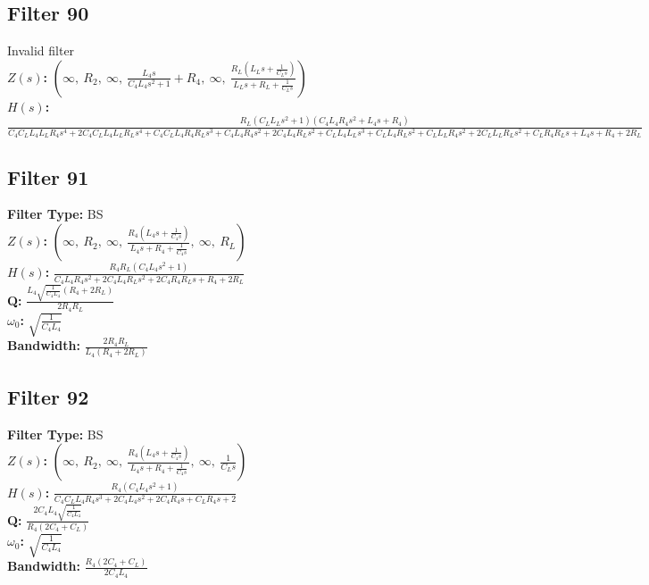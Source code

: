 \documentclass{article}
\begin{document}
\subsection*{Filter 90}
Invalid filter \\ 
\textbf{$Z(s)$:} $\left( \infty, \  R_{2}, \  \infty, \  \frac{L_{4} s}{C_{4} L_{4} s^{2} + 1} + R_{4}, \  \infty, \  \frac{R_{L} \left(L_{L} s + \frac{1}{C_{L} s}\right)}{L_{L} s + R_{L} + \frac{1}{C_{L} s}}\right)$ \\ 
\textbf{$H(s)$:} $\frac{R_{L} \left(C_{L} L_{L} s^{2} + 1\right) \left(C_{4} L_{4} R_{4} s^{2} + L_{4} s + R_{4}\right)}{C_{4} C_{L} L_{4} L_{L} R_{4} s^{4} + 2 C_{4} C_{L} L_{4} L_{L} R_{L} s^{4} + C_{4} C_{L} L_{4} R_{4} R_{L} s^{3} + C_{4} L_{4} R_{4} s^{2} + 2 C_{4} L_{4} R_{L} s^{2} + C_{L} L_{4} L_{L} s^{3} + C_{L} L_{4} R_{L} s^{2} + C_{L} L_{L} R_{4} s^{2} + 2 C_{L} L_{L} R_{L} s^{2} + C_{L} R_{4} R_{L} s + L_{4} s + R_{4} + 2 R_{L}}$ \\ 
\subsection*{Filter 91}
\textbf{Filter Type:} BS \\ 
\textbf{$Z(s)$:} $\left( \infty, \  R_{2}, \  \infty, \  \frac{R_{4} \left(L_{4} s + \frac{1}{C_{4} s}\right)}{L_{4} s + R_{4} + \frac{1}{C_{4} s}}, \  \infty, \  R_{L}\right)$ \\ 
\textbf{$H(s)$:} $\frac{R_{4} R_{L} \left(C_{4} L_{4} s^{2} + 1\right)}{C_{4} L_{4} R_{4} s^{2} + 2 C_{4} L_{4} R_{L} s^{2} + 2 C_{4} R_{4} R_{L} s + R_{4} + 2 R_{L}}$ \\ 
\textbf{Q:} $\frac{L_{4} \sqrt{\frac{1}{C_{4} L_{4}}} \left(R_{4} + 2 R_{L}\right)}{2 R_{4} R_{L}}$ \\ 
\textbf{$\omega_0$:} $\sqrt{\frac{1}{C_{4} L_{4}}}$ \\ 
\textbf{Bandwidth:} $\frac{2 R_{4} R_{L}}{L_{4} \left(R_{4} + 2 R_{L}\right)}$ \\ 
\subsection*{Filter 92}
\textbf{Filter Type:} BS \\ 
\textbf{$Z(s)$:} $\left( \infty, \  R_{2}, \  \infty, \  \frac{R_{4} \left(L_{4} s + \frac{1}{C_{4} s}\right)}{L_{4} s + R_{4} + \frac{1}{C_{4} s}}, \  \infty, \  \frac{1}{C_{L} s}\right)$ \\ 
\textbf{$H(s)$:} $\frac{R_{4} \left(C_{4} L_{4} s^{2} + 1\right)}{C_{4} C_{L} L_{4} R_{4} s^{3} + 2 C_{4} L_{4} s^{2} + 2 C_{4} R_{4} s + C_{L} R_{4} s + 2}$ \\ 
\textbf{Q:} $\frac{2 C_{4} L_{4} \sqrt{\frac{1}{C_{4} L_{4}}}}{R_{4} \left(2 C_{4} + C_{L}\right)}$ \\ 
\textbf{$\omega_0$:} $\sqrt{\frac{1}{C_{4} L_{4}}}$ \\ 
\textbf{Bandwidth:} $\frac{R_{4} \left(2 C_{4} + C_{L}\right)}{2 C_{4} L_{4}}$ \\ 
\end{document}
